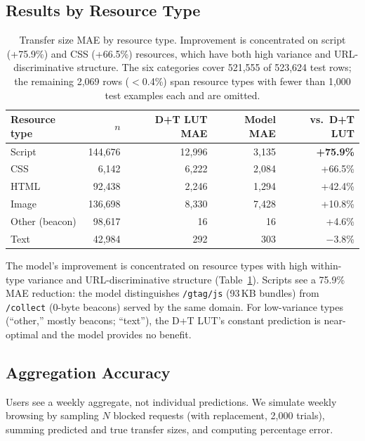 \documentclass[sigconf,nonacm]{acmart}
\newcommand{\numtestrows}{523{,}624\xspace}
\begin{document}
\subsection{Results by Resource Type}
\label{sec:by-type}

\begin{table}[t]
\centering
\small
\begin{tabular}{lrrrr}
\toprule
Resource type & $n$ & D+T LUT MAE & Model MAE & vs.\ D+T LUT \\
\midrule
Script & 144,676 & 12,996 & 3,135 & \textbf{+75.9\%} \\
CSS & 6,142 & 6,222 & 2,084 & +66.5\% \\
HTML & 92,438 & 2,246 & 1,294 & +42.4\% \\
Image & 136,698 & 8,330 & 7,428 & +10.8\% \\
Other (beacon) & 98,617 & 16 & 16 & +4.6\% \\
Text & 42,984 & 292 & 303 & $-$3.8\% \\
\bottomrule
\end{tabular}
\caption{Transfer size MAE by resource type. Improvement is concentrated on script (+75.9\%) and CSS (+66.5\%) resources, which have both high variance and URL-discriminative structure. The six categories cover 521{,}555 of \numtestrows test rows; the remaining 2{,}069 rows ($<$0.4\%) span resource types with fewer than 1{,}000 test examples each and are omitted.}
\label{tab:by-type}
\end{table}

The model's improvement is concentrated on resource types with high within-type variance and URL-discriminative structure (Table~\ref{tab:by-type}).
Scripts see a 75.9\% MAE reduction: the model distinguishes \texttt{/gtag/js} (93\,KB bundles) from \texttt{/collect} (0-byte beacons) served by the same domain.
For low-variance types (``other,'' mostly beacons; ``text''), the D+T LUT's constant prediction is near-optimal and the model provides no benefit.

\subsection{Aggregation Accuracy}
\label{sec:aggregation}

Users see a weekly aggregate, not individual predictions.
We simulate weekly browsing by sampling $N$ blocked requests (with replacement, 2,000 trials), summing predicted and true transfer sizes, and computing percentage error.
\end{document}

